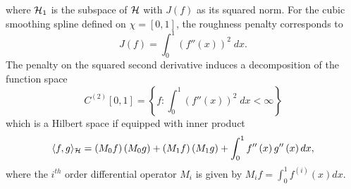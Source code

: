 \noindent
where $\mathcal{H}_1$ is the subspace of $\mathcal{H}$ with $J\left(f\right)$ as its squared norm. For the cubic smoothing spline defined on $\chi = \left[0,1\right]$, the roughness penalty corresponds to 
\begin{equation} \label{eq:SS-penalty-functional}
J\left(f\right) = \int_0^1  \left(f''\left(x\right)\right)^2\;dx.
\end{equation}
\noindent
The penalty on the squared second derivative induces a decomposition of the function space
\begin{equation*}
C^{\left(2\right)}\left[0,1\right] = \left\{f: \int_{0}^1 \left(f''\left(x\right)\right)^2\;dx < \infty \right\}
\end{equation*}
\noindent %
which is a Hilbert space if equipped with inner product
\begin{align} \label{eq:SS-RKHS-inner-product}
\langle f,g \rangle_\hilbert=\left(M_{0} f \right)\left(M_{0} g\right) + \left(M_{1} f\right) \left(M_{1} g\right) + \int_0^1 f''\left(x\right)g''\left(x\right)dx,%
\end{align}
\noindent
where the $i^{th}$ order differential operator $M_i$ is given by $M_i f = \int_0^1 f^{\left( i \right)}\left(x\right) dx$. 

\noindent


\bigskip
 
